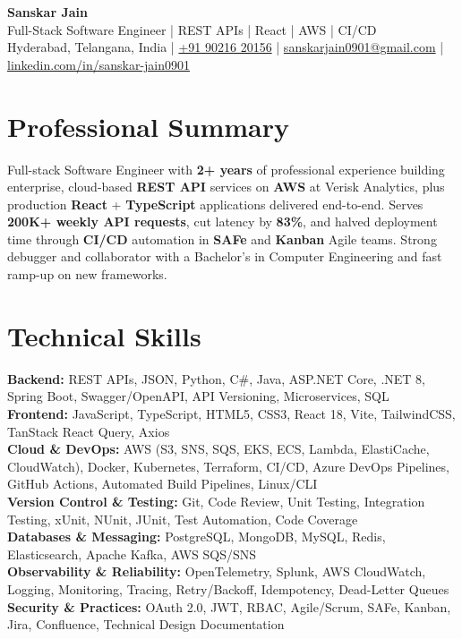 \documentclass[a4paper,10pt]{article}
\begin{document}
\begin{center}
    {\LARGE \textbf{Sanskar Jain}} \\
    \vspace{2pt}
    Full-Stack Software Engineer \;|\; REST APIs \;|\; React \;|\; AWS \;|\; CI/CD \\
    \vspace{2pt}
    Hyderabad, Telangana, India \;|\;
    \href{tel:+919021620156}{+91 90216 20156} \;|\;
    \href{mailto:sanskarjain0901@gmail.com}{sanskarjain0901@gmail.com} \;|\;
    \href{https://www.linkedin.com/in/sanskar-jain0901/}{linkedin.com/in/sanskar-jain0901}
\end{center}

\section*{Professional Summary}
Full-stack Software Engineer with \textbf{2+ years} of professional experience building enterprise, cloud-based \textbf{REST API} services on \textbf{AWS} at Verisk Analytics, plus production \textbf{React} + \textbf{TypeScript} applications delivered end-to-end.
Serves \textbf{200K+ weekly API requests}, cut latency by \textbf{83\%}, and halved deployment time through \textbf{CI/CD} automation in \textbf{SAFe} and \textbf{Kanban} Agile teams.
Strong debugger and collaborator with a Bachelor's in Computer Engineering and fast ramp-up on new frameworks.

\section*{Technical Skills}
\begin{sloppypar}
\noindent
\textbf{Backend:} REST APIs, JSON, Python, C\#, Java, ASP.NET Core, .NET 8, Spring Boot, Swagger/OpenAPI, API Versioning, Microservices, SQL \\
\textbf{Frontend:} JavaScript, TypeScript, HTML5, CSS3, React 18, Vite, TailwindCSS, TanStack React Query, Axios \\
\textbf{Cloud \& DevOps:} AWS (S3, SNS, SQS, EKS, ECS, Lambda, ElastiCache, CloudWatch), Docker, Kubernetes, Terraform, CI/CD, Azure DevOps Pipelines, GitHub Actions, Automated Build Pipelines, Linux/CLI \\
\textbf{Version Control \& Testing:} Git, Code Review, Unit Testing, Integration Testing, xUnit, NUnit, JUnit, Test Automation, Code Coverage \\
\textbf{Databases \& Messaging:} PostgreSQL, MongoDB, MySQL, Redis, Elasticsearch, Apache Kafka, AWS SQS/SNS \\
\textbf{Observability \& Reliability:} OpenTelemetry, Splunk, AWS CloudWatch, Logging, Monitoring, Tracing, Retry/Backoff, Idempotency, Dead-Letter Queues \\
\textbf{Security \& Practices:} OAuth 2.0, JWT, RBAC, Agile/Scrum, SAFe, Kanban, Jira, Confluence, Technical Design Documentation
\end{sloppypar}
\end{document}
